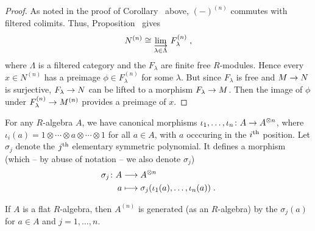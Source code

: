 \documentclass[a4paper,parskip=half,numbers=enddot, DIV=12]{scrreprt}
\begin{document}
\begin{proof}
	As noted in the proof of Corollary~ above, $(-)^{(n)}$ commutes with filtered colimits. Thus, Proposition~ gives 
	\begin{align*}
		N^{(n)}\cong \colimit[\lambda\in\Lambda] F_\lambda^{(n)}\;,
	\end{align*}
	where $\Lambda$ is a filtered category and the $F_\lambda$ are finite free $R$-modules. Hence every $x\in N^{(n)}$ has a preimage $\phi\in F_\lambda^{(n)}$ for some $\lambda$. But since $F_\lambda$ is free and $M\morphism N$ is surjective, $F_\lambda\morphism N$ can be lifted to a morphism $F_\lambda\morphism M$. Then the image of $\phi$ under $F_\lambda^{(n)}\morphism M^{(n)}$ provides a preimage of $x$.
\end{proof}
\begin{con}
	For any $R$-algebra $A$, we have canonical morphisms $\iota_1,\ldots,\iota_n\colon A\morphism A^{\otimes n}$, where $\iota_i(a)=1\otimes \cdots \otimes a\otimes \cdots \otimes 1$ for all $a\in A$, with $a$ occcuring in the $i^{\text{th}}$ position. Let $\sigma_j$ denote the $j^{\text{th}}$ elementary symmetric polynomial. It defines a morphism (which -- by abuse of notation -- we also denote $\sigma_j$)
	\begin{align*}
	\sigma_j\colon A&\morphism A^{\otimes n}\\
	a&\longmapsto \sigma_j(\iota_1(a),\ldots,\iota_n(a))\;.
	\end{align*}
\end{con}
\begin{cor}
	If $A$ is a flat $R$-algebra, then $A^{(n)}$ is generated (as an $R$-algebra) by the $\sigma_j(a)$ for $a\in A$ and $j=1,\ldots,n$.
\end{cor}
\end{document}
